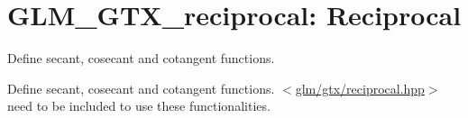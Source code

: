 \hypertarget{group__gtx__reciprocal}{\section{\-G\-L\-M\-\_\-\-G\-T\-X\-\_\-reciprocal\-: \-Reciprocal}
\label{group__gtx__reciprocal}
}


\-Define secant, cosecant and cotangent functions.  


\-Define secant, cosecant and cotangent functions. $<$\hyperlink{reciprocal_8hpp}{glm/gtx/reciprocal.\-hpp}$>$ need to be included to use these functionalities. 